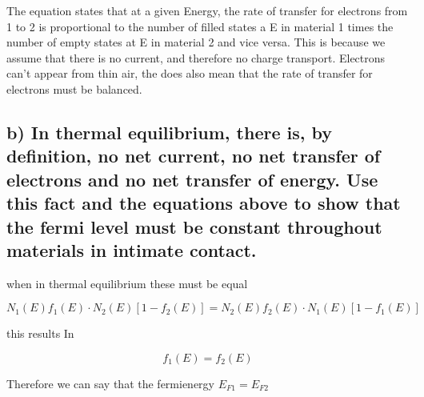     The equation states that at a given Energy, the rate of transfer for electrons from 1 to 2  is proportional to the number of filled states a E in material 1 times the number of empty states at E in material 2 and vice versa. This is because we assume that there is no current, and therefore no charge transport. Electrons can't appear from thin air, the does also mean that the rate of transfer for electrons must be balanced.

    \subsection*{b) In thermal equilibrium, there is, by definition, no net current, no net transfer of electrons
    and no net transfer of energy. Use this fact and the equations above to show that the
    fermi level must be constant throughout materials in intimate contact.}

    when in thermal equilibrium these must be equal

    \begin{equation*}
        N_{1}(E) f_{1}(E) \cdot N_{2}(E)\left[1-f_{2}(E)\right]=N_{2}(E) f_{2}(E) \cdot N_{1}(E)\left[1-f_{1}(E)\right] 
    \end{equation*}

    this results In

    \begin{equation*}
        f_1(E)=f_2(E)
    \end{equation*}

    Therefore we can say that the fermienergy $E_{F1}=E_{F2}$